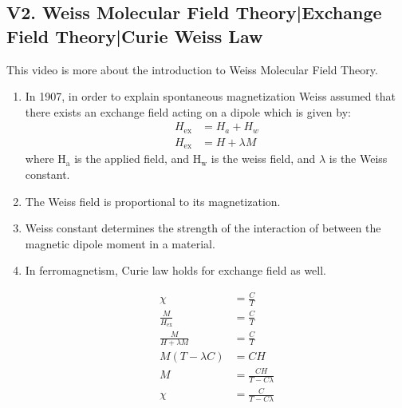 \subsection*{V2. Weiss Molecular Field Theory|Exchange Field Theory|Curie Weiss Law}

This video is more about the introduction to Weiss Molecular Field Theory.
\begin{enumerate}
    \item In 1907, in order to explain spontaneous magnetization Weiss assumed that there exists an exchange field acting on a dipole which is given by:\\
    \begin{equation}
    \begin{split}
    H_{\mathrm{ex}} &= H_a + H_w \\
    H_{\mathrm{ex}} &= H + \lambda M
    \end{split}
    \end{equation}
    where $\mathrm{H_a}$ is the applied field, and $\mathrm{H_w}$ is the weiss field, and $\lambda$ is the Weiss constant.
    \item The Weiss field is proportional to its magnetization.
    \item Weiss constant determines the strength of the interaction of between the magnetic dipole moment in a material.
    \item In ferromagnetism, Curie law holds for exchange field as well.
\begin{figure}[htbp]
\centering
\begin{minipage}{0.55\textwidth}
\begin{equation}
\begin{split}
\chi &= \frac{C}{T} \\
\frac{M}{H_{\mathrm{ex}}} &= \frac{C}{T} \\
\frac{M}{H + \lambda M} &= \frac{C}{T} \\
M(T - \lambda C) &= C H \\
M &= \frac{C H}{T - C\lambda} \\
\chi &= \frac{C}{T - C\lambda}
\end{split}
\end{equation}

\vspace{0.5em}


\end{minipage}
\end{figure}
\end{enumerate}
